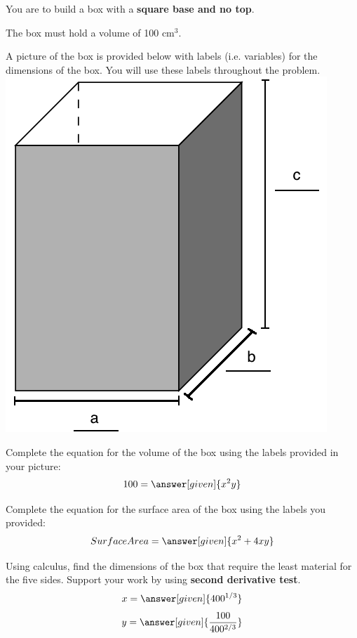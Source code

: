 \documentclass[handout]{ximera}
\begin{document}
\begin{problem}
You are to build a box with a \textbf{square base and no top}. 

The box must hold a volume of 100 cm$^3$. 

A picture of the box is provided below with labels (i.e. variables) for the dimensions of the box.  You will use these labels throughout the problem.
\includegraphics[scale=0.25]{boxlabels.png} %

\begin{question}
Complete the equation for the volume of the box using the labels provided in your picture:
	\[
	\displaystyle  100 =    \answer[given]{x^{2}y}
	\] 
\end{question}

\begin{question}
Complete the equation for the surface area of the box using the labels you provided: 
	\[
	\displaystyle  Surface Area =    \answer[given]{x^{2}+4xy}
	\]
\end{question}

\begin{question}
Using calculus, find the dimensions of the box that require the least material for the five sides. Support your work by using \textbf{second derivative test}. 
	\[
	\displaystyle  x = \answer[given]{400^{1/3}} 
	\]
	\[
	\displaystyle y = \answer[given]{\frac{100}{400^{2/3}}}
	\]
\end{question}


\end{problem}
\end{document}
